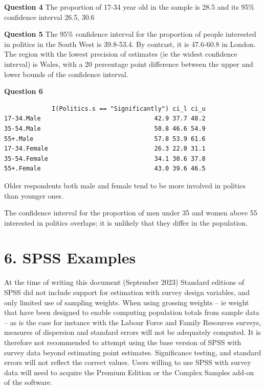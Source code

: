 \documentclass[
  14,
  a4paper,
  DIV=11,
  numbers=noendperiod]{scrartcl}
\begin{document}
\textbf{Question 4} The proportion of 17-34 year old in the sample is
28.5 and its 95\% confidence interval 26.5, 30.6

\textbf{Question 5} The 95\% confidence interval for the proportion of
people interested in politics in the South West is 39.8-53.4. By
contrast, it is 47.6-60.8 in London. The region with the lowest
precision of estimates (ie the widest confidence interval) is Wales,
with a 20 percentage point difference between the upper and lower bounds
of the confidence interval.

\textbf{Question 6}

\begin{verbatim}
             I(Politics.s == "Significantly") ci_l ci_u
17-34.Male                               42.9 37.7 48.2
35-54.Male                               50.8 46.6 54.9
55+.Male                                 57.8 53.9 61.6
17-34.Female                             26.3 22.0 31.1
35-54.Female                             34.1 30.6 37.8
55+.Female                               43.0 39.6 46.5
\end{verbatim}

Older respondents both male and female tend to be more involved in
politics than younger ones.

The confidence interval for the proportion of men under 35 and women
above 55 interested in politics overlaps; it is unlikely that they
differ in the population.

\hypertarget{spss-examples}{%
\section{6. SPSS Examples}\label{spss-examples}}

At the time of writing this document (September 2023) Standard editions
of SPSS did not include support for estimation with survey design
variables, and only limited use of sampling weights. When using grossing
weights -- ie weight that have been designed to enable computing
population totals from sample data -- as is the case for instance with
the Labour Force and Family Resources surveys, measures of dispersion
and standard errors will not be adequately computed. It is therefore not
recommended to attempt using the base version of SPSS with survey data
beyond estimating point estimates. Significance testing, and standard
errors will not reflect the correct values. Users willing to use SPSS
with survey data will need to acquire the Premium Edition or the Complex
Samples add-on of the software.
\end{document}
